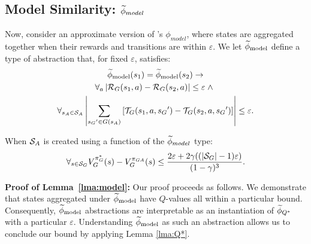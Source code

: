 \subsection{Model Similarity: $\widetilde \phi_{model}$}
\label{sec:model}

Now, consider an approximate version of \citet{li2006towards}'s $\phi_{model}$, where states are aggregated together when their rewards and transitions are within $\varepsilon$.
\bdefn{$\epM$}
We let $\epM$ define a type of abstraction that, for fixed $\varepsilon$, satisfies:
\begin{multline}
\widetilde \phi_{\text{model}}(s_1) = \widetilde \phi_{\text{model}}(s_2) \rightarrow \\
\forall_a \left| \mathcal{R}_G(s_1, a) - \mathcal{R}_G(s_2, a)\right| \leq \varepsilon\; \wedge\ \\
\forall_{s_A \in \mathcal{S}_A} \left|\sum_{{s_G}' \in G(s_A)} \left[\mathcal{T}_G(s_1, a, {s_G}') - \mathcal{T}_G(s_2, a,{s_G}')\right] \right| \leq \varepsilon.
\end{multline}
\edefn

\begin{lma}
\label{lma:model}
When $\mathcal{S}_A$ is created using a function of the $\widetilde \phi_{model}$ type:
\begin{equation}
\forall_{s \in \mathcal{S}_G} V_G^{\pi_G^*}(s) - V_G^{\pi_{GA}}(s) \leq \frac{2\varepsilon + 2\gamma((|\mathcal{S}_G|-1)\varepsilon)}{(1-\gamma)^3}.
\end{equation}
\end{lma}

{\bf Proof of Lemma~\ref{lma:model}:} Our proof proceeds as follows. We demonstrate that states aggregated under $\epM$ have $Q$-values all within a particular bound. Consequently, $\epM$ abstractions are interpretable as an instantiation of $\widetilde \phi_{Q^*}$ with a particular $\varepsilon$. Understanding $\epM$ as such an abstraction allows us to conclude our bound by applying Lemma \ref{lma:Q*}.

